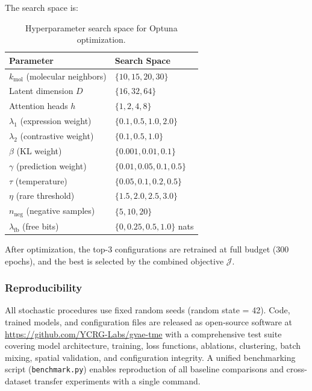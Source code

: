 \documentclass{article}
\begin{document}
The search space is:

\begin{table}[H]
\centering
\caption{Hyperparameter search space for Optuna optimization.}
\label{tab:hpsearch}
\begin{tabular}{ll}
\toprule
Parameter & Search Space \\
\midrule
$k_{\text{mol}}$ (molecular neighbors) & $\{10, 15, 20, 30\}$ \\
Latent dimension $D$ & $\{16, 32, 64\}$ \\
Attention heads $h$ & $\{1, 2, 4, 8\}$ \\
$\lambda_1$ (expression weight) & $\{0.1, 0.5, 1.0, 2.0\}$ \\
$\lambda_2$ (contrastive weight) & $\{0.1, 0.5, 1.0\}$ \\
$\beta$ (KL weight) & $\{0.001, 0.01, 0.1\}$ \\
$\gamma$ (prediction weight) & $\{0.01, 0.05, 0.1, 0.5\}$ \\
$\tau$ (temperature) & $\{0.05, 0.1, 0.2, 0.5\}$ \\
$\eta$ (rare threshold) & $\{1.5, 2.0, 2.5, 3.0\}$ \\
$n_{\text{neg}}$ (negative samples) & $\{5, 10, 20\}$ \\
$\lambda_{\text{fb}}$ (free bits) & $\{0, 0.25, 0.5, 1.0\}$ nats \\
\bottomrule
\end{tabular}
\end{table}

After optimization, the top-3 configurations are retrained at full budget (300 epochs), and the best is selected by the combined objective $\mathcal{J}$.

\subsubsection{Reproducibility}

All stochastic procedures use fixed random seeds (random state = 42). Code, trained models, and configuration files are released as open-source software at \url{https://github.com/YCRG-Labs/gvae-tme} with a comprehensive test suite covering model architecture, training, loss functions, ablations, clustering, batch mixing, spatial validation, and configuration integrity. A unified benchmarking script (\texttt{benchmark.py}) enables reproduction of all baseline comparisons and cross-dataset transfer experiments with a single command.

\newpage


\end{document}
